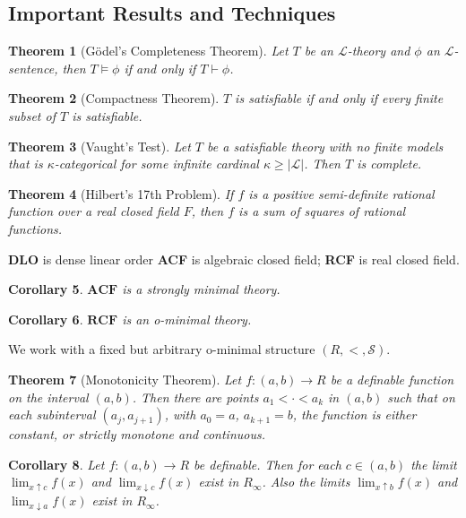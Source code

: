 \documentclass{amsart}
\newtheorem{theorem}{Theorem}[section]
\newtheorem{corollary}[theorem]{Corollary}
\theoremstyle{definition}
\numberwithin{equation}{section}
\begin{document}
\subsection{Important Results and Techniques}

\begin{theorem}[G\"odel's Completeness Theorem]
    Let $T$ be an $\mathcal{L}$-theory and $\phi$ an $\mathcal{L}$-sentence, then $T \models \phi$ if and only if $T\vdash \phi$.
\end{theorem}

\begin{theorem}[Compactness Theorem]
    $T$ is satisfiable if and only if every finite subset of $T$ is satisfiable.
\end{theorem}

\begin{theorem}[Vaught's Test]
    Let $T$ be a satisfiable theory with no finite models that is 
    $\kappa$-categorical for some infinite cardinal $\kappa \ge |\mathcal{L}|$.
    Then $T$ is complete.
\end{theorem}

\begin{theorem}[Hilbert's 17th Problem]
    If $f$ is a positive semi-definite rational function over a real closed field $F$,
    then $f$ is a sum of squares of rational functions.
\end{theorem}

\textbf{DLO} is dense linear order
\textbf{ACF} is algebraic closed field;
\textbf{RCF} is real closed field.

\begin{corollary}
    $\mathbf{ACF}$ is a strongly minimal theory.
\end{corollary}

\begin{corollary}
    $\mathbf{RCF}$ is an o-minimal theory.
\end{corollary}

We work with a fixed but arbitrary o-minimal structure $(R,<,\mathcal{S})$.

\begin{theorem}[Monotonicity Theorem]
    Let $f: (a,b)\to R$ be a definable function on the interval $(a,b)$.
    Then there are points $a_1 < \cdot < a_k$ in $(a,b)$ such that on each subinterval $(a_j,a_{j+1})$,
    with $a_0 = a$, $a_{k+1} = b$,
    the function is either constant, or strictly monotone and continuous.
\end{theorem}

\begin{corollary}
    Let $f: (a,b) \to R$ be definable.
    Then for each $c\in (a,b)$ the limit $\lim_{x\uparrow c}f(x)$
    and $\lim_{x\downarrow c}f(x)$ exist in $R_{\infty}$.
    Also the limits $\lim_{x\uparrow b}f(x)$ and $\lim_{x\downarrow a}f(x)$ exist in $R_{\infty}$.
\end{corollary}
\end{document}
